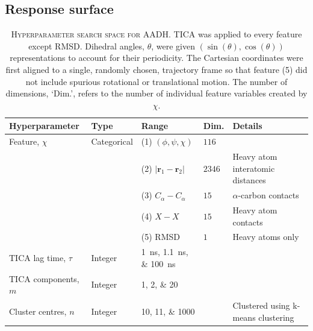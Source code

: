 \subsection{Response surface}\label{sec:aadh_rsm}

\begin{table}[ht]
    \caption[Hyperparameter search space for AADH]{\textsc{Hyperparameter search space for AADH}. TICA was applied to every feature except RMSD. Dihedral angles, $\theta$, were given $\left(\sin(\theta),\cos(\theta)\right)$ representations to account for their periodicity.  The Cartesian coordinates were first aligned to a single, randomly chosen, trajectory frame so that feature (5) did not include spurious rotational or translational motion. The number of dimensions, `Dim.', refers to the number of individual feature variables created by $\chi$.}
    \centering
    \begin{tabularx}{0.9\textwidth}{ >{\raggedright\arraybackslash}ll>{\raggedright\arraybackslash}Xl >{\raggedright\arraybackslash}X } 
    \toprule
    Hyperparameter & Type & Range & Dim. & Details \\
     \midrule
    Feature, $\chi$ & Categorical & (1) $(\phi, \psi, \chi)$ & $\num{116}$  & \\
    & & (2) $|\mathbf{r}_{1}-\mathbf{r}_{2}|$  & $\num{ 2346}$& Heavy atom interatomic distances \\
    & & (3) $C_{\alpha}-C_{\alpha}$ & $\num{15}$ & $\alpha$-carbon contacts\\ 
    & & (4) $X-X$  & $\num{15}$ & Heavy atom contacts\\ 
    & & (5) RMSD & $\num{1}$ &  Heavy atoms only\\ 
    \midrule
    TICA lag time, $\tau$ & Integer &\SIlist[list-final-separator = { ... }]{1;1.1;100}{ns} &  & \\
    \midrule
    TICA components, $m$& Integer &\numlist[list-final-separator = { ... }]{1;2;20} & & \\
    \midrule
    Cluster centres, $n$ & Integer & \numlist[list-final-separator = { ... }]{10;11;1000}& &  Clustered using k-means clustering  \\
    
     \bottomrule
    \end{tabularx}
    \label{tab:aadh_searchspace}
\end{table}

